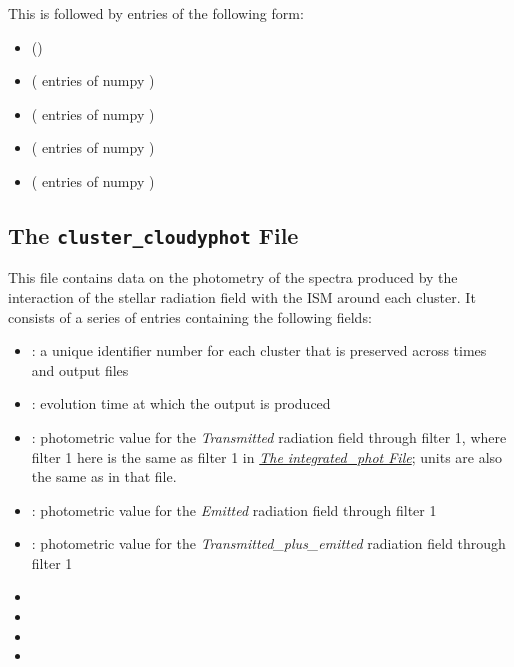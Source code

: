 \documentclass[letterpaper,10pt,english]{sphinxmanual}
\begin{document}
This is followed by  entries of the following form:
\begin{itemize}
\item {} 
 ()

\item {} 
 ( entries of numpy )

\item {} 
 ( entries of numpy )

\item {} 
 ( entries of numpy )

\item {} 
 ( entries of numpy
)

\end{itemize}


\subsection{The \texttt{cluster\_cloudyphot} File}
\label{cloudy:the-cluster-cloudyphot-file}
This file contains data on the photometry of the spectra produced by
the interaction of the stellar radiation field with the ISM around
each cluster. It consists of a series of entries containing the
following fields:
\begin{itemize}
\item {} 
: a unique identifier number for each cluster that is
preserved across times and output files

\item {} 
: evolution time at which the output is produced

\item {} 
: photometric value for the \emph{Transmitted}
radiation field through filter 1, where filter 1 here is the same as
filter 1 in {\hyperref[output:ssec-int-phot-file]{\emph{The integrated\_phot File}}}; units are also the same as
in that file.

\item {} 
: photometric value for the \emph{Emitted}
radiation field through filter 1

\item {} 
: photometric value for the
\emph{Transmitted\_plus\_emitted} radiation field through filter 1

\item {} 

\item {} 

\item {} 

\item {} 

\end{itemize}
\end{document}
